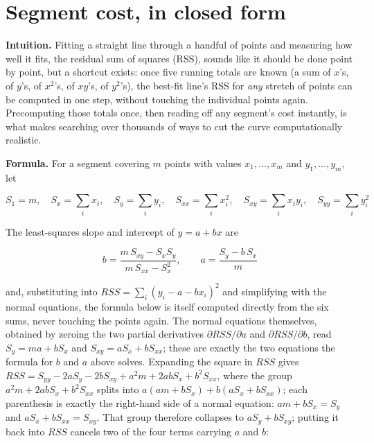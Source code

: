 \documentclass[11pt]{article}
\begin{document}
\section{Segment cost, in closed form}

\textbf{Intuition.} Fitting a straight line through a handful of points and
measuring how well it fits, the residual sum of squares (RSS), sounds like
it should be done point by point, but a shortcut exists: once five running
totals are known (a sum of $x$'s, of $y$'s, of $x^2$'s, of $xy$'s, of
$y^2$'s), the best-fit line's RSS for \emph{any} stretch of points can be
computed in one step, without touching the individual points again.
Precomputing those totals once, then reading off any segment's cost
instantly, is what makes searching over thousands of ways to cut the curve
computationally realistic.

\textbf{Formula.} For a segment covering $m$ points with values $x_1,
\dots, x_m$ and $y_1, \dots, y_m$, let

\begin{equation}
S_1 = m,\quad S_x = \sum_i x_i,\quad S_y = \sum_i y_i,\quad S_{xx} = \sum_i x_i^2,\quad S_{xy} = \sum_i x_i y_i,\quad S_{yy} = \sum_i y_i^2
\end{equation}

The least-squares slope and intercept of $y = a + bx$ are

\begin{equation}
b = \frac{m\,S_{xy} - S_x S_y}{m\,S_{xx} - S_x^2}, \qquad a = \frac{S_y - b\,S_x}{m}
\end{equation}

and, substituting into $RSS = \sum_i (y_i - a - b x_i)^2$ and simplifying
with the normal equations, the formula below is itself computed
directly from the six sums, never touching the points again. The
normal equations themselves, obtained by zeroing the two partial
derivatives $\partial RSS/\partial a$ and $\partial RSS/\partial b$,
read $S_y = ma + b S_x$ and $S_{xy} = aS_x + bS_{xx}$; these are
exactly the two equations the formula for $b$ and $a$ above solves.
Expanding the square in $RSS$ gives $RSS = S_{yy} - 2aS_y - 2bS_{xy} +
a^2 m + 2ab S_x + b^2 S_{xx}$, where the group $a^2 m + 2abS_x + b^2
S_{xx}$ splits into $a(am + bS_x) + b(aS_x + bS_{xx})$; each
parenthesis is exactly the right-hand side of a normal equation:
$am+bS_x = S_y$ and $aS_x + bS_{xx} = S_{xy}$. That group therefore
collapses to $aS_y + bS_{xy}$; putting it back into $RSS$ cancels
two of the four terms carrying $a$ and $b$:
\end{document}
